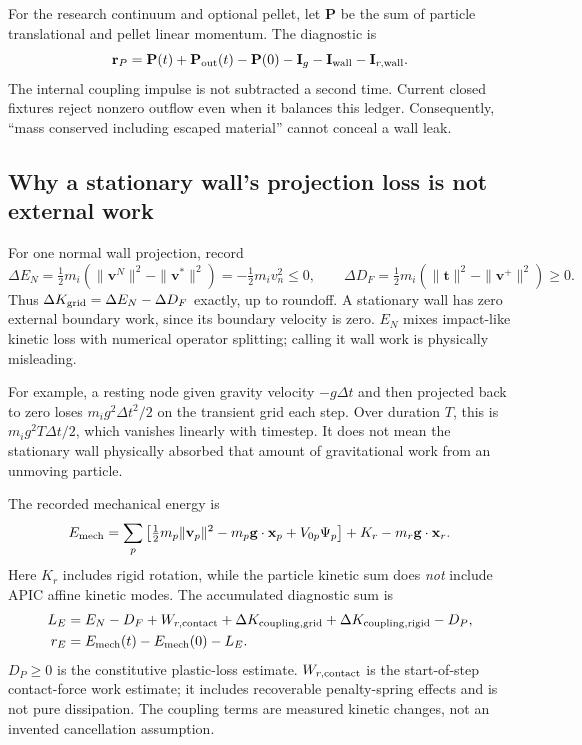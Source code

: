 For the research continuum and optional pellet, let $\mathbf{P}$ be the sum of
particle translational and pellet linear momentum. The diagnostic is
\begin{equation}
 \mathbf{r}_P=\mathbf{P}(t)+\mathbf{P}_{\rm out}(t)-\mathbf{P}(0)
 -\mathbf{I}_g-\mathbf{I}_{\rm wall}-\mathbf{I}_{r,\rm wall}.
\end{equation}
The internal coupling impulse is not subtracted a second time. Current closed
fixtures reject nonzero outflow even when it balances this ledger. Consequently,
``mass conserved including escaped material'' cannot conceal a wall leak.

\subsection{Why a stationary wall's projection loss is not external work}
For one normal wall projection, record
\begin{equation}
 \Delta E_N=\tfrac12m_i(\|\mathbf{v}^{N}\|^2-\|\mathbf{v}^*\|^2)
          =-\tfrac12m_i v_n^2\leq0,\qquad
 \Delta D_F=\tfrac12m_i(\|\mathbf{t}\|^2-\|\mathbf{v}^{+}\|^2)\geq0.
 \label{eq:wall-energy}
\end{equation}
Thus $\Delta K_{\rm grid}=\Delta E_N-\Delta D_F$ exactly, up to roundoff.
A stationary wall has zero external boundary work, since its boundary velocity
is zero. $E_N$ mixes impact-like kinetic loss with numerical operator splitting;
calling it wall work is physically misleading.

For example, a resting node given gravity velocity $-g\Delta t$ and then
projected back to zero loses $m_i g^2\Delta t^2/2$ on the transient grid each
step. Over duration $T$, this is $m_i g^2T\Delta t/2$, which vanishes linearly
with timestep. It does not mean the stationary wall physically absorbed that
amount of gravitational work from an unmoving particle.

The recorded mechanical energy is
\begin{equation}
 E_{\rm mech}=\sum_p\left[\tfrac12m_p\|\mathbf{v}_p\|^2
       -m_p\mathbf{g}\cdot\mathbf{x}_p+V_{0p}\Psi_p\right]
       +K_r-m_r\mathbf{g}\cdot\mathbf{x}_r. \label{eq:mechanical-energy}
\end{equation}
Here $K_r$ includes rigid rotation, while the particle kinetic sum does
\emph{not} include APIC affine kinetic modes. The accumulated diagnostic sum is
\begin{align}
 L_E&=E_N-D_F+W_{r,\rm contact}
      +\Delta K_{\rm coupling,grid}+\Delta K_{\rm coupling,rigid}-D_P,\nonumber\\
 r_E&=E_{\rm mech}(t)-E_{\rm mech}(0)-L_E. \label{eq:energy-residual}
\end{align}
$D_P\geq0$ is the constitutive plastic-loss estimate.
$W_{r,\rm contact}$ is the start-of-step contact-force work estimate; it includes
recoverable penalty-spring effects and is not pure dissipation. The coupling
terms are measured kinetic changes, not an invented cancellation assumption.

